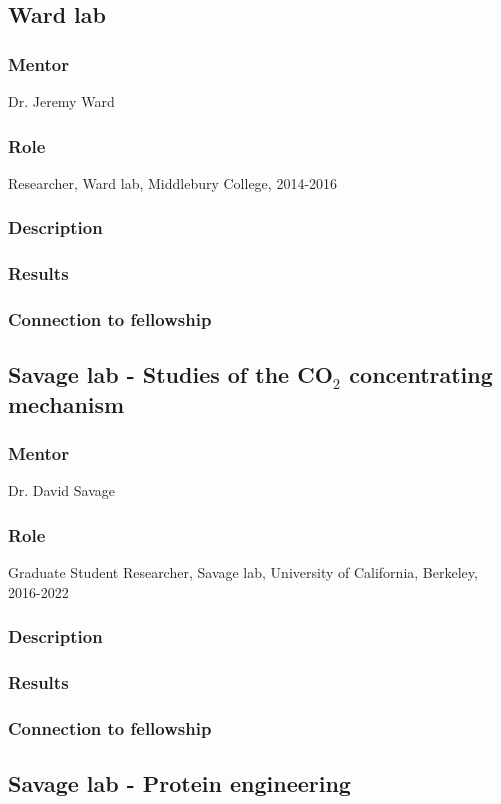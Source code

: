 \documentclass[11pt]{article}
\begin{document}
\subsection{Ward lab}
%
\subsubsection{Mentor}
Dr. Jeremy Ward
%
\subsubsection{Role}
Researcher, Ward lab, Middlebury College, 2014-2016
%
\subsubsection{Description}
%
\subsubsection{Results}
%
\subsubsection{Connection to fellowship}
%
\subsection{Savage lab - Studies of the CO$_2$ concentrating mechanism}
%
\subsubsection{Mentor}
Dr. David Savage
%
\subsubsection{Role}
Graduate Student Researcher, Savage lab, University of California, Berkeley, 2016-2022
%
\subsubsection{Description}
%
\subsubsection{Results}
%
\subsubsection{Connection to fellowship}
%
\subsection{Savage lab - Protein engineering}
%
\end{document}
